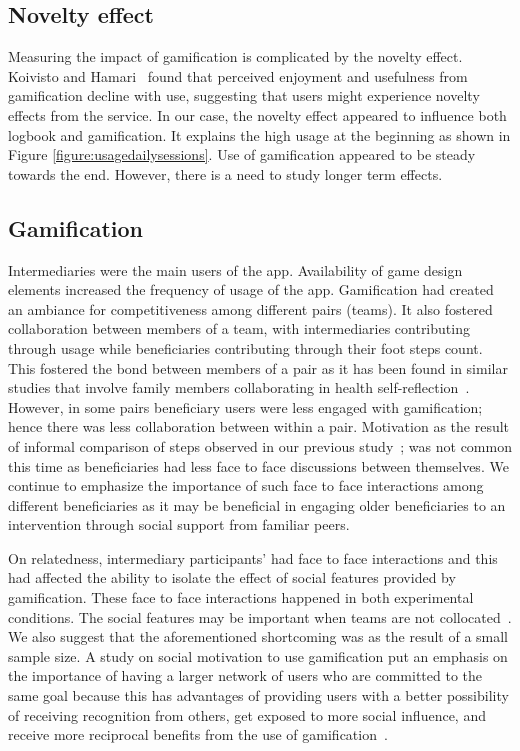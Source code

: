 \documentclass{sig-alternate}
\begin{document}
\subsection*{\textbf{Novelty effect}}
Measuring the impact of gamification is complicated by the novelty effect. Koivisto and Hamari~\cite{koivisto2014demographic} found that perceived enjoyment and usefulness from gamification decline with use, suggesting that users might experience novelty effects from the service. In our case, the novelty effect appeared to influence both logbook and gamification. It explains the high usage at the beginning as shown in Figure \ref{figure:usagedailysessions}. Use of gamification appeared to be steady towards the end. However, there is a need to study longer term effects.

\subsection*{\textbf{Gamification}} 
Intermediaries were the main users of the app. Availability of game design elements increased the frequency of usage of the app. Gamification had created an ambiance for competitiveness among different pairs (teams). It also fostered collaboration between members of a team, with intermediaries contributing through usage while beneficiaries contributing through their foot steps count. This fostered the bond between members of a pair as it has been found in similar studies that involve family members collaborating in health self-reflection~\cite{grimes2009toward,saksono2015spaceship}. However, in some pairs beneficiary users were less engaged with gamification; hence there was less collaboration between within a pair. Motivation as the result of informal comparison of steps observed in our previous study~\cite{katule2016:leveraging}; was not common this time as beneficiaries had less face to face discussions between themselves. We continue to emphasize the importance of such face to face interactions among different beneficiaries as it may be beneficial in engaging older beneficiaries to an intervention through social support from familiar peers.

On relatedness, intermediary participants' had face to face interactions and this had affected the ability to isolate the effect of social features provided by gamification. These face to face interactions happened in both experimental conditions. The social features may be important when teams are not collocated~\cite{lin2006:fish}. We also suggest that the aforementioned shortcoming was as the result of a small sample size. A study on social motivation to use gamification put an emphasis on the importance of having a larger network of users who are committed to the same goal because this has advantages of providing users with a better possibility of receiving recognition from others, get exposed to more social influence, and receive more reciprocal benefits from the use of gamification~\cite{hamari2013social}.
\end{document}
